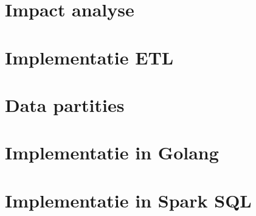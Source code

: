 \documentclass[whitelogo]{tudelft-report}
\begin{document}










\appendix

% 

\chapter{Impact analyse}
\label{app:impact_analyse}


\chapter{Implementatie ETL}
\label{app:json_format}


\chapter{Data partities}
\label{app:partities}


\chapter{Implementatie in Golang}
\label{app:golang_code}


\chapter{Implementatie in Spark SQL}
\label{app:spark_code}


\printbibliography
\end{document}
